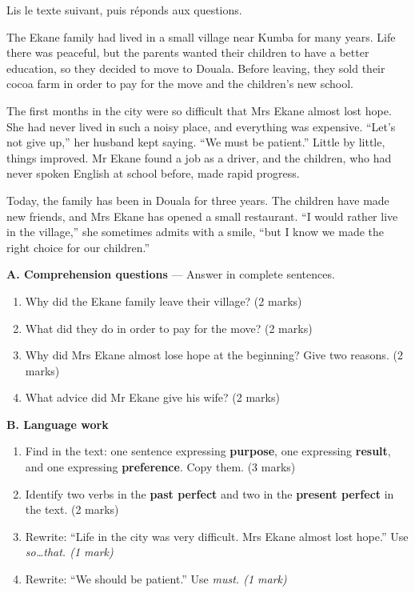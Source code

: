 \documentclass[11pt]{article}
\newcommand{\eng}[1]{\ifmmode\text{\textit{#1}}\else\begingroup\selectlanguage{english}\itshape #1\endgroup\fi}
\begin{document}
\begin{exercice}
Lis le texte suivant, puis réponds aux questions.

\begin{textebox}
The Ekane family had lived in a small village near Kumba for many years. Life there was peaceful, but the parents wanted their children to have a better education, so they decided to move to Douala. Before leaving, they sold their cocoa farm in order to pay for the move and the children's new school.

The first months in the city were so difficult that Mrs Ekane almost lost hope. She had never lived in such a noisy place, and everything was expensive. “Let's not give up,” her husband kept saying. “We must be patient.” Little by little, things improved. Mr Ekane found a job as a driver, and the children, who had never spoken English at school before, made rapid progress.

Today, the family has been in Douala for three years. The children have made new friends, and Mrs Ekane has opened a small restaurant. “I would rather live in the village,” she sometimes admits with a smile, “but I know we made the right choice for our children.”
\end{textebox}

\textbf{A. Comprehension questions} — Answer in complete sentences.
\begin{enumerate}
\item Why did the Ekane family leave their village? (2 marks)
\item What did they do in order to pay for the move? (2 marks)
\item Why did Mrs Ekane almost lose hope at the beginning? Give two reasons. (2 marks)
\item What advice did Mr Ekane give his wife? (2 marks)
\end{enumerate}

\textbf{B. Language work}
\begin{enumerate}
\item Find in the text: one sentence expressing \textbf{purpose}, one expressing \textbf{result}, and one expressing \textbf{preference}. Copy them. (3 marks)
\item Identify two verbs in the \textbf{past perfect} and two in the \textbf{present perfect} in the text. (2 marks)
\item Rewrite: “Life in the city was very difficult. Mrs Ekane almost lost hope.” Use \eng{so\ldots that}. (1 mark)
\item Rewrite: “We should be patient.” Use \eng{must}. (1 mark)
\end{enumerate}
\end{exercice}
\end{document}
